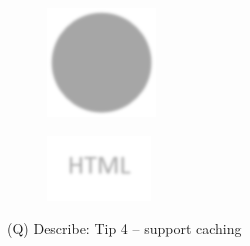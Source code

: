 \documentclass[12pt]{article}
\begin{document}
\begin{figure}[H]
\includegraphics[width=0.5\linewidth]{page54-image-8.png}
\end{figure}
\begin{figure}[H]
\includegraphics[width=0.5\linewidth]{page54-image-9.png}
\end{figure}
\clearpage
(Q)
Describe: Tip 4 – support caching
\clearpage
\end{document}
